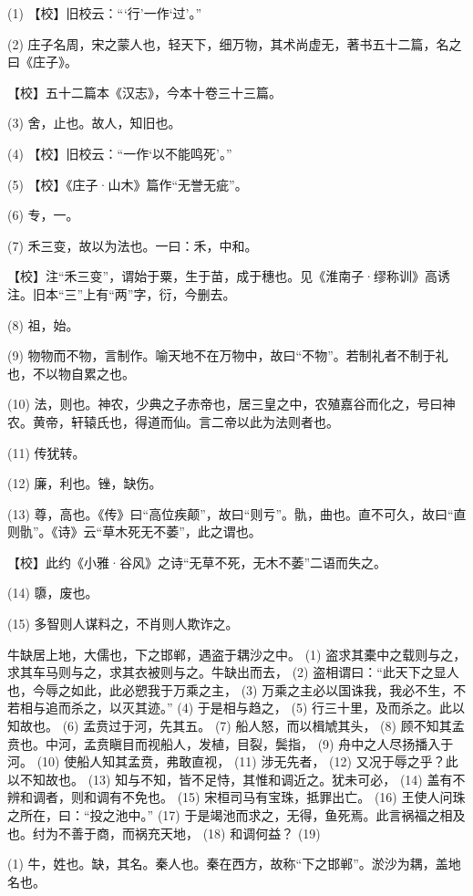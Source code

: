 \documentclass[12pt,UTF8]{ctexbook}
\begin{document}
(1) 【校】旧校云：“‘行’一作‘过’。”

(2) 庄子名周，宋之蒙人也，轻天下，细万物，其术尚虚无，著书五十二篇，名之曰《庄子》。

【校】五十二篇本《汉志》，今本十卷三十三篇。

(3) 舍，止也。故人，知旧也。

(4) 【校】旧校云：“一作‘以不能鸣死’。”

(5) 【校】《庄子·山木》篇作“无誉无疵”。

(6) 专，一。

(7) 禾三变，故以为法也。一曰：禾，中和。

【校】注“禾三变”，谓始于粟，生于苗，成于穗也。见《淮南子·缪称训》高诱注。旧本“三”上有“两”字，衍，今删去。

(8) 祖，始。

(9) 物物而不物，言制作。喻天地不在万物中，故曰“不物”。若制礼者不制于礼也，不以物自累之也。

(10) 法，则也。神农，少典之子赤帝也，居三皇之中，农殖嘉谷而化之，号曰神农。黄帝，轩辕氏也，得道而仙。言二帝以此为法则者也。

(11) 传犹转。

(12) 廉，利也。锉，缺伤。

(13) 尊，高也。《传》曰“高位疾颠”，故曰“则亏”。骩，曲也。直不可久，故曰“直则骩”。《诗》云“草木死无不萎”，此之谓也。

【校】此约《小雅·谷风》之诗“无草不死，无木不萎”二语而失之。

(14) 隳，废也。

(15) 多智则人谋料之，不肖则人欺诈之。

牛缺居上地，大儒也，下之邯郸，遇盗于耦沙之中。 (1) 盗求其橐中之载则与之，求其车马则与之，求其衣被则与之。牛缺出而去， (2) 盗相谓曰：“此天下之显人也，今辱之如此，此必愬我于万乘之主， (3) 万乘之主必以国诛我，我必不生，不若相与追而杀之，以灭其迹。” (4) 于是相与趋之， (5) 行三十里，及而杀之。此以知故也。 (6) 孟贲过于河，先其五。 (7) 船人怒，而以楫虓其头， (8) 顾不知其孟贲也。中河，孟贲瞋目而视船人，发植，目裂，鬓指， (9) 舟中之人尽扬播入于河。 (10) 使船人知其孟贲，弗敢直视， (11) 涉无先者， (12) 又况于辱之乎？此以不知故也。 (13) 知与不知，皆不足恃，其惟和调近之。犹未可必， (14) 盖有不辨和调者，则和调有不免也。 (15) 宋桓司马有宝珠，抵罪出亡。 (16) 王使人问珠之所在，曰：“投之池中。” (17) 于是竭池而求之，无得，鱼死焉。此言祸福之相及也。纣为不善于商，而祸充天地， (18) 和调何益？ (19)

(1) 牛，姓也。缺，其名。秦人也。秦在西方，故称“下之邯郸”。淤沙为耦，盖地名也。
\end{document}

